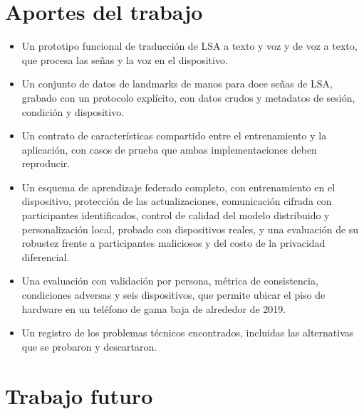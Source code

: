 \section{Aportes del trabajo}

\begin{itemize}
    \item Un prototipo funcional de traducción de LSA a texto y voz y de voz a texto, que procesa las señas y la voz en el dispositivo.
    \item Un conjunto de datos de landmarks de manos para doce señas de LSA, grabado con un protocolo explícito, con datos crudos y metadatos de sesión, condición y dispositivo.
    \item Un contrato de características compartido entre el entrenamiento y la aplicación, con casos de prueba que ambas implementaciones deben reproducir.
    \item Un esquema de aprendizaje federado completo, con entrenamiento en el dispositivo, protección de las actualizaciones, comunicación cifrada con participantes identificados, control de calidad del modelo distribuido y personalización local, probado con dispositivos reales, y una evaluación de su robustez frente a participantes maliciosos y del costo de la privacidad diferencial.
    \item Una evaluación con validación por persona, métrica de consistencia, condiciones adversas y seis dispositivos, que permite ubicar el piso de hardware en un teléfono de gama baja de alrededor de 2019.
    \item Un registro de los problemas técnicos encontrados, incluidas las alternativas que se probaron y descartaron.
\end{itemize}

\section{Trabajo futuro}

